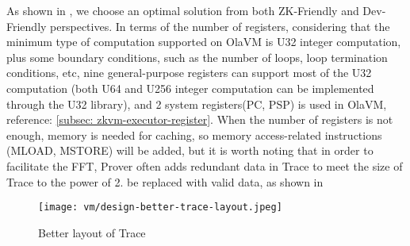 As shown in , we choose an optimal solution from both ZK-Friendly and Dev-Friendly perspectives. In terms of the number of
registers, considering that the minimum type of computation supported on OlaVM is U32 integer computation, plus some boundary conditions,
such as the number of loops, loop termination conditions, etc, nine general-purpose registers can support most of the U32 computation
(both U64 and U256 integer computation can be implemented through the U32 library), and 2 system registers(PC, PSP) is used in OlaVM, reference: \ref{subsec: zkvm-executor-register}. 
When the number of registers is not enough, memory is needed for caching, so memory access-related instructions
(MLOAD, MSTORE) will be added, but it is worth noting that in order to facilitate the FFT, Prover often adds redundant data in Trace to meet
the size of Trace to the power of 2. be replaced with valid data, as shown in 

\begin{figure}[!ht]
    \centering
    \texttt{[image: vm/design-better-trace-layout.jpeg]}
    \caption{Better layout of Trace}
    \label{fig:design-better-trace-layout}
\end{figure}